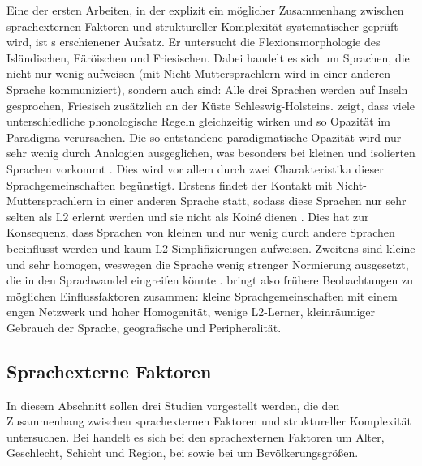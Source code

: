 Eine der ersten Arbeiten, in der explizit ein möglicher Zusammenhang zwischen sprachexternen Faktoren und struktureller Komplexität systematischer geprüft wird, ist \citeauthor{Braunmüller1984}s \citeyear{Braunmüller1984} erschienener Aufsatz. Er untersucht die Flexionsmorphologie des Isländischen, Färöischen und Friesischen. Dabei handelt es sich um Sprachen, die nicht nur wenig  aufweisen (mit Nicht-Mut\-ter\-sprach\-lern wird in einer anderen Sprache kommuniziert), sondern auch  sind: Alle drei Sprachen werden auf Inseln gesprochen, Friesisch zusätzlich an der Küste Schleswig-Holsteins. \citet{Braunmüller1984} zeigt, dass viele unterschiedliche phonologische Regeln gleichzeitig wirken und so Opazität im Paradigma verursachen. Die so entstandene paradigmatische Opazität wird nur sehr wenig durch Analogien ausgeglichen, was besonders bei kleinen und isolierten Sprachen vorkommt \citep[49]{Braunmüller1984}. Dies wird vor allem durch zwei Charakteristika dieser Sprachgemeinschaften begünstigt. Erstens findet der Kontakt mit Nicht-Mut\-ter\-sprach\-lern in einer anderen Sprache statt, sodass diese Sprachen nur sehr selten als L2 erlernt werden und sie nicht als Koiné dienen \citep[49]{Braunmüller1984}. Dies hat zur Konsequenz, dass Sprachen von kleinen und  nur wenig durch andere Sprachen beeinflusst werden und kaum L2-Sim\-pli\-fi\-zie\-rungen aufweisen. Zweitens sind kleine und  sehr homogen, weswegen die Sprache wenig strenger Normierung ausgesetzt, die in den Sprachwandel eingreifen könnte \citep[49]{Braunmüller1984}. \citet{Braunmüller1984} bringt also frühere Beobachtungen zu möglichen Einflussfaktoren zusammen: kleine Sprachgemeinschaften mit einem engen Netzwerk und hoher Homogenität, wenige L2-Ler\-ner, kleinräumiger Gebrauch der Sprache, geografische  und Peripheralität. 

\subsection{Sprachexterne Faktoren}\label{2.2.2}

In diesem Abschnitt sollen drei Studien vorgestellt werden, die den Zusammenhang zwischen sprachexternen Faktoren und struktureller Komplexität untersuchen. Bei \citet{Sampson2001} handelt es sich bei den sprachexternen Faktoren um Alter, Geschlecht, Schicht und Region, bei \citet{HayBauer2007} sowie bei \citet{Sinnemäki2009} um Bevölkerungsgrößen.

